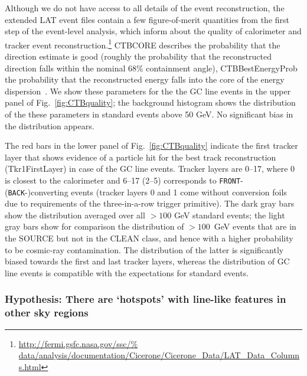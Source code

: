 \documentclass[aps,twocolumn,prd,superscriptaddress,showpacs,nofootinbib,fixfloat]{revtex4}
\begin{document}
Although we do not have access to all details of the event reconstruction, the
extended LAT event files contain a few figure-of-merit quantities from the first step of the
event-level analysis, which inform about the quality of
calorimeter and tracker event reconstruction.\footnote{\url{http://fermi.gsfc.nasa.gov/ssc/%
data/analysis/documentation/Cicerone/Cicerone\_Data/LAT\_Data\_Columns.html}}
CTBCORE describes the probability that the direction estimate
is good (roughly the probability that the reconstructed
direction falls within the nominal 68\% containment angle),
CTBBestEnergyProb the probability that the reconstructed
energy falls into the core of the energy
dispersion~\cite{collaboration:2012kca}. We show
these parameters for the the GC line events in the upper
panel of Fig.~\ref{fig:CTBquality}; the background histogram
shows the distribution of the these parameters in standard
events above 50 GeV. No significant bias in the distribution
appears.

The red bars in the lower panel of
Fig.~\ref{fig:CTBquality} indicate the first tracker layer that
shows evidence of a particle hit for the best track
reconstruction (Tkr1FirstLayer) in case of the GC line
events.  Tracker layers are 0--17, where 0 is closest to the
calorimeter and 6--17 (2--5) corresponds to \texttt{FRONT}-
(\texttt{BACK}-)converting events (tracker layers 0 and 1 come
without conversion foils due to requirements of the three-in-a-row trigger
primitive). The dark gray bars show the
distribution averaged over all $>100$ GeV standard events;
the light gray bars
show for comparison the distribution of $>100$~GeV events that are in the SOURCE
but not in the CLEAN class, and hence with a higher
probability to be cosmic-ray contamination. The distribution of the latter is significantly biased
towards the first and last tracker layers, whereas
the distribution of GC line events is compatible with the
expectations for standard events.

\subsubsection{Hypothesis: There are `hotspots' with
line-like features in other sky regions}
\end{document}

